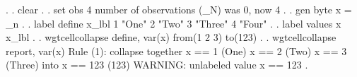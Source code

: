 {\smallskip}
. 
. clear
{\smallskip}
. 
. set obs 4 
number of observations (_N) was 0, now 4
{\smallskip}
. 
. gen byte x = _n
{\smallskip}
. 
. label define x_lbl 1 "One" 2 "Two" 3 "Three" 4 "Four"
{\smallskip}
. 
. label values x x_lbl
{\smallskip}
. 
. wgtcellcollapse define, var(x) from(1 2 3) to(123)
{\smallskip}
. 
. wgtcellcollapse report, var(x)
{\smallskip}
Rule (1): collapse together
  x == 1 (One)
  x == 2 (Two)
  x == 3 (Three)
  into x == 123 (123)
  WARNING: unlabeled value x == 123
{\smallskip}
{\smallskip}
. 
